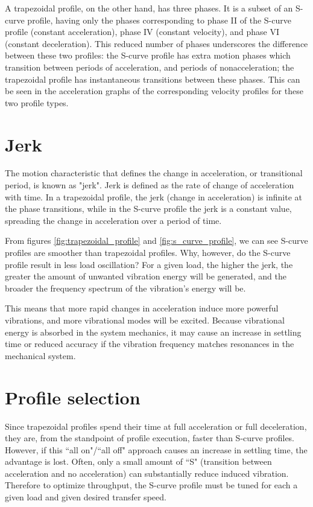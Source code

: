 A trapezoidal profile, on the other hand, has three phases. It is a subset of an
S-curve profile, having only the phases corresponding to phase II of the S-curve
profile (constant acceleration), phase IV (constant velocity), and phase VI
(constant deceleration). This reduced number of phases underscores the
difference between these two profiles: the S-curve profile has extra motion
phases which transition between periods of acceleration, and periods of
nonacceleration; the trapezoidal profile has instantaneous transitions between
these phases. This can be seen in the acceleration graphs of the corresponding
velocity profiles for these two profile types.

\section{Jerk}

The motion characteristic that defines the change in acceleration, or
transitional period, is known as "jerk". Jerk is defined as the rate of change
of acceleration with time. In a trapezoidal profile, the jerk (change in
acceleration) is infinite at the phase transitions, while in the S-curve profile
the jerk is a constant value, spreading the change in acceleration over a period
of time.

From figures \ref{fig:trapezoidal_profile} and \ref{fig:s_curve_profile}, we can
see S-curve profiles are smoother than trapezoidal profiles. Why, however, do
the S-curve profile result in less load oscillation? For a given load, the
higher the jerk, the greater the amount of unwanted vibration energy will be
generated, and the broader the frequency spectrum of the vibration's energy will
be.

This means that more rapid changes in acceleration induce more powerful
vibrations, and more vibrational modes will be excited. Because vibrational
energy is absorbed in the system mechanics, it may cause an increase in
\gls{settling time} or reduced accuracy if the vibration frequency matches
resonances in the mechanical system.

\section{Profile selection}

Since trapezoidal profiles spend their time at full acceleration or full
deceleration, they are, from the standpoint of profile execution, faster than
S-curve profiles. However, if this ``all on"/``all off" approach causes an
increase in settling time, the advantage is lost. Often, only a small amount of
``S" (transition between acceleration and no acceleration) can substantially
reduce induced vibration. Therefore to optimize throughput, the S-curve profile
must be tuned for each a given load and given desired transfer speed.


